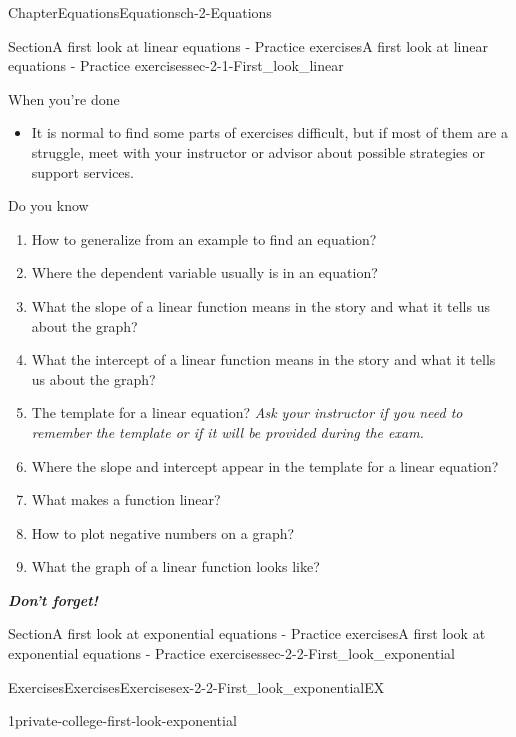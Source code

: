 \documentclass[twoside,11pt,]{book}
\newcommand{\alert}[1]{\textbf{\textit{#1}}}
\numberwithin{equation}{section}
\begin{document}
\begin{chapterptx}{Chapter}{Equations}{}{Equations}{}{}{ch-2-Equations}
\begin{sectionptx}{Section}{A first look at linear equations - Practice exercises}{}{A first look at linear equations - Practice exercises}{}{}{sec-2-1-First_look_linear}
\begin{conclusion}{When you're done \textellipsis{}}
\begin{itemize}[label=\textbullet]
\item{}It is normal to find some parts of exercises difficult, but if most of them are a struggle, meet with your instructor or advisor about possible strategies or support services.%
\end{itemize}
%
\end{conclusion}%
\begin{conclusion}{Do you know \textellipsis{}}%
%
\begin{enumerate}[label={\Alph*.}]
\item{}How to generalize from an example to find an equation?%
\item{}Where the dependent variable usually is in an equation?%
\item{}What the slope of a linear function means in the story and what it tells us about the graph?%
\item{}What the intercept of a linear function means in the story and what it tells us about the graph?%
\item{}The template for a linear equation? \emph{Ask your instructor if you need to remember the template or if it will be provided during the exam.}%
\item{}Where the slope and intercept appear in the template for a linear equation?%
\item{}What makes a function linear?%
\item{}How to plot negative numbers on a graph?%
\item{}What the graph of a linear function looks like?%
\end{enumerate}
%
\par
\alert{Don't forget!}%
\end{conclusion}%
\end{sectionptx}
%
%
\typeout{************************************************}
\typeout{************************************************}
%
\begin{sectionptx}{Section}{A first look at exponential equations - Practice exercises}{}{A first look at exponential equations - Practice exercises}{}{}{sec-2-2-First_look_exponential}
%
%
\typeout{************************************************}
\typeout{************************************************}
%
\begin{exercises-subsection-numberless}{Exercises}{Exercises}{}{Exercises}{}{}{ex-2-2-First_look_exponentialEX}
\begin{divisionexercise}{1}{}{}{private-college-first-look-exponential}%

\end{divisionexercise}
\end{exercises-subsection-numberless}
\end{sectionptx}
\end{chapterptx}
\end{document}
